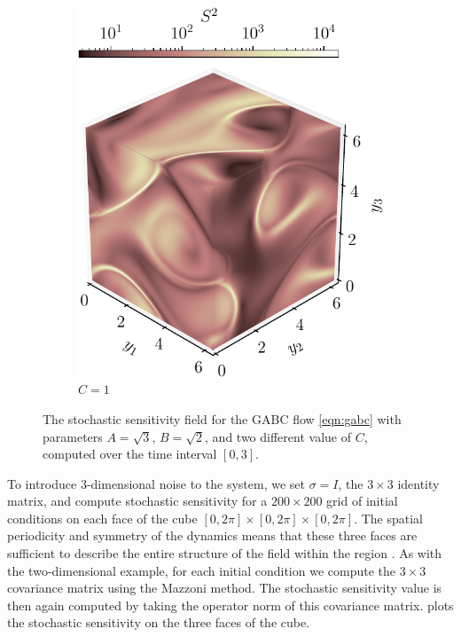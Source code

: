 \begin{figure}
\begin{subfigure}[t]{0.49\textwidth}
		\includegraphics[width=\textwidth]{chp04_paper_numerics/figures/gabc/S2_box_1.7320508075688772_1.4142135623730951_1_cropped}
		\caption{\(C = 1\)}
		\label{fig:gabc_S2_1}
	\end{subfigure}
	\caption{The stochastic sensitivity field for the GABC flow \cref{eqn:gabc} with parameters \(A = \sqrt{3}\), \(B = \sqrt{2}\), and two different value of \(C\), computed over the time interval \([0,3]\).}
	\label{fig:gabc_S2}
\end{figure}

To introduce 3-dimensional noise to the system, we set \(\sigma = I\), the \(3 \times 3\) identity matrix, and compute stochastic sensitivity for a \(200\times 200\) grid of initial conditions on each face of the cube \([0,2\pi] \times [0,2\pi] \times [0,2\pi]\).
The spatial periodicity and symmetry of the dynamics means that these three faces are sufficient to describe the entire structure of the field within the region \citep{DombreEtAl_1986_ChaoticStreamlinesABC}.
As with the two-dimensional example, for each initial condition we compute the \(3 \times 3\) covariance matrix using the Mazzoni method.
The stochastic sensitivity value is then again computed by taking the operator norm of this covariance matrix.
 plots the stochastic sensitivity on the three faces of the cube.

